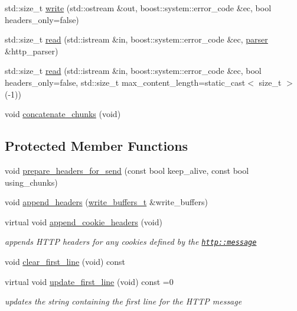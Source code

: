 \begin{DoxyCompactItemize}
std\-::size\-\_\-t \hyperlink{classpion_1_1http_1_1message_a4a3911ad03031a1ddacfa4cedeb125a2}{write} (std\-::ostream \&out, boost\-::system\-::error\-\_\-code \&ec, bool headers\-\_\-only=false)
\item 
std\-::size\-\_\-t \hyperlink{classpion_1_1http_1_1message_a7b67f3e8303d838bb5d379ab72a35e2d}{read} (std\-::istream \&in, boost\-::system\-::error\-\_\-code \&ec, \hyperlink{classpion_1_1http_1_1parser}{parser} \&http\-\_\-parser)
\item 
std\-::size\-\_\-t \hyperlink{classpion_1_1http_1_1message_ae99b6c39dd1b878520125f7037c035de}{read} (std\-::istream \&in, boost\-::system\-::error\-\_\-code \&ec, bool headers\-\_\-only=false, std\-::size\-\_\-t max\-\_\-content\-\_\-length=static\-\_\-cast$<$ size\-\_\-t $>$(-\/1))
\item 
void \hyperlink{classpion_1_1http_1_1message_aeffca5e2173be2b83f38b630d07f4bfd}{concatenate\-\_\-chunks} (void)
\end{DoxyCompactItemize}
\subsection*{Protected Member Functions}
\begin{DoxyCompactItemize}
\item 
void \hyperlink{classpion_1_1http_1_1message_a1addd3b90c3b048c895f9723371f329f}{prepare\-\_\-headers\-\_\-for\-\_\-send} (const bool keep\-\_\-alive, const bool using\-\_\-chunks)
\item 
void \hyperlink{classpion_1_1http_1_1message_a3184733c3a21b8aa44d8f301eaf52697}{append\-\_\-headers} (\hyperlink{classpion_1_1http_1_1message_aacf9a6a7677c32e4ab764ac97d0b5e7b}{write\-\_\-buffers\-\_\-t} \&write\-\_\-buffers)
\item 
virtual void \hyperlink{classpion_1_1http_1_1message_a532d475ab2dfdcdb969445902fad2e6f}{append\-\_\-cookie\-\_\-headers} (void)
\begin{DoxyCompactList}\small\item\em appends H\-T\-T\-P headers for any cookies defined by the \href{http::message}{\tt http\-::message} \end{DoxyCompactList}\item 
void \hyperlink{classpion_1_1http_1_1message_ab47dc3343c9b2cbc7fdf8605e4b7d3b2}{clear\-\_\-first\-\_\-line} (void) const 
\item 
virtual void \hyperlink{classpion_1_1http_1_1message_a697a832ab0741d02ddecd8df8da0265d}{update\-\_\-first\-\_\-line} (void) const =0
\begin{DoxyCompactList}\small\item\em updates the string containing the first line for the H\-T\-T\-P message \end{DoxyCompactList}\end{DoxyCompactItemize}

